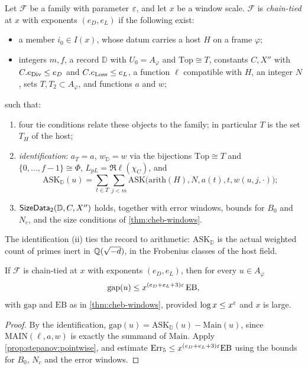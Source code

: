 \begin{definition}\label{def:chaintied}
Let $\mathcal F$ be a family with parameter $\varepsilon$, and let $x$ be a window scale.
$\mathcal F$ is \emph{chain-tied} at $x$ with exponents $(e_D,e_L)$ if the following exist:
\begin{itemize}
\item a member $i_0\in I(x)$, whose datum carries a host $H$ on a frame $\varphi$;
\item integers $m,f$, a record $\mathbb D$ with $U_0=A_\varphi$ and $\mathrm{Top}\cong T$, constants
$C,X''$ with $C.e_{\rm Div}\le e_D$ and $C.e_{\rm Loss}\le e_L$, a function $\ell$ compatible with $H$,
an integer $N$, sets $T,T_2\subset A_\varphi$, and functions $a$ and $w$;
\end{itemize}
such that:
\begin{enumerate}[label=(\roman*)]
\item four tie conditions relate these objects to the family; in particular $T$ is the set $T_H$ of
the host;
\item \emph{identification}: $a_T=a$, $w_{\mathbb D}=w$ via the bijections $\mathrm{Top}\cong T$ and
$\{0,\dots,f-1\}\cong\Phi$, $L_{pL}=\Re\ell(\chi_C)$, and
\[
\mathrm{ASK}_{\mathbb D}(u)=\sum_{t\in T}\sum_{j<m}\mathrm{ASK}\big(\mathrm{arith}(H),N,a(t),t,w(u,j,\cdot)\big);
\]
\item $\mathsf{SizeData}_2(\mathbb D,C,X'')$ holds, together with error windows, bounds for $B_0$ and
$N_c$, and the size conditions of \cref{thm:cheb-windows}.
\end{enumerate}
\end{definition}

The identification (ii) ties the record to arithmetic: $\mathrm{ASK}_{\mathbb D}$ is the actual weighted
count of primes inert in $\mathbb{Q}(\sqrt{-d})$, in the Frobenius classes of the host field.

\begin{proposition}\label{prop:gap-bound}
If $\mathcal F$ is chain-tied at $x$ with exponents $(e_D,e_L)$, then for every $u\in A_\varphi$
\[
\mathrm{gap}(u)\le x^{(e_D+e_L+3)\varepsilon}\,\mathrm{EB},
\]
with $\mathrm{gap}$ and $\mathrm{EB}$ as in \cref{thm:cheb-windows}, provided $\log x\le x^\varepsilon$ and $x$
is large. 
\end{proposition}

\begin{proof}
By the identification, $\mathrm{gap}(u)=\mathrm{ASK}_{\mathbb D}(u)-\mathrm{Main}(u)$, since
$\mathrm{MAIN}(\ell,a,w)$ is exactly the summand of $\mathrm{Main}$. Apply
\cref{prop:stepanov:pointwise}, and estimate
$\mathrm{Err}_5\le x^{(e_D+e_L+3)\varepsilon}\mathrm{EB}$ using the bounds for $B_0$, $N_c$ and the error
windows.
\end{proof}

